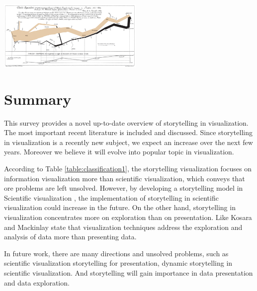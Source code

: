 \documentclass{egpubl}
\begin{document}
\begingroup
\centering
\includegraphics[width=7cm]{./images/StorytellingTheNextStepForVisualisation}
\label{fig:StorytellingTheNextStepForVisualisation}
\endgroup


\section{Summary}
This survey provides a novel up-to-date overview of storytelling in visualization. The most important recent literature is included and discussed. Since storytelling in visualization is a recently new subject, we expect an increase over the next few years. Moreover we believe it will evolve into popular topic in visualization.


According to Table \ref{table:classification1}, the storytelling visualization focuses on information visualization more than scientific visualization, which conveys that ore problems are left unsolved. However, by developing a storytelling model in Scientific visualization \cite{wohlfart2}, the implementation of storytelling in scientific visualization could increase in the future. On the other hand, storytelling in visualization concentrates more on exploration than on presentation. Like  Kosara and Mackinlay \cite{Kosara} state that visualization techniques address the exploration and analysis of data more than presenting data.

In future work, there are many directions and unsolved problems, such as scientific visualization storytelling for presentation, dynamic storytelling in scientific visualization. And storytelling will gain importance in data presentation and data exploration.



\newpage
%



\end{document}
